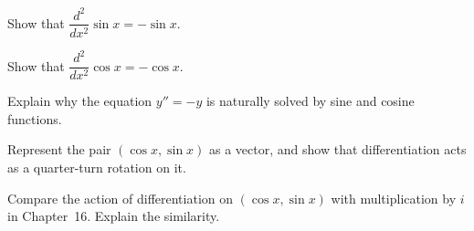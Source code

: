 \begin{exercise}
Show that $\dfrac{d^2}{dx^2}\sin x = -\sin x$.
\end{exercise}

\begin{exercise}
Show that $\dfrac{d^2}{dx^2}\cos x = -\cos x$.
\end{exercise}

\begin{exercise}
Explain why the equation $y'' = -y$ is naturally solved by sine and
cosine functions.
\end{exercise}

\begin{exercise}
Represent the pair $(\cos x, \sin x)$ as a vector, and show that
differentiation acts as a quarter-turn rotation on it.
\end{exercise}

\begin{exercise}
Compare the action of differentiation on $(\cos x, \sin x)$ with
multiplication by $i$ in Chapter~16. Explain the similarity.
\end{exercise}

